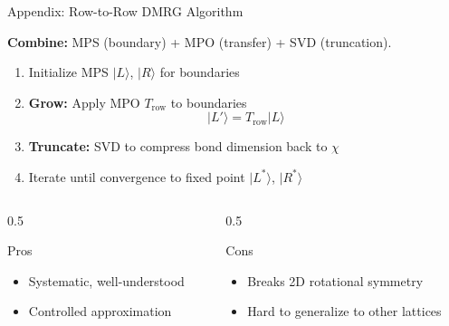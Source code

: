 \documentclass[aspectratio=169, 11pt]{beamer}
\begin{document}
\begin{frame}{Appendix: Row-to-Row DMRG Algorithm}
    
    \textbf{Combine:} MPS (boundary) + MPO (transfer) + SVD (truncation).
    
    \vspace{0.3cm}
    
    \begin{enumerate}
        \item Initialize MPS $|L\rangle$, $|R\rangle$ for boundaries
        
        \item \textbf{Grow:} Apply MPO $T_{\text{row}}$ to boundaries
        \[
        |L'\rangle = T_{\text{row}} |L\rangle
        \]
        
        \item \textbf{Truncate:} SVD to compress bond dimension back to $\chi$
        
        \item Iterate until convergence to fixed point $|L^*\rangle$, $|R^*\rangle$
    \end{enumerate}
    
    \vspace{0.3cm}
    
    \begin{columns}
        \begin{column}{0.5\textwidth}
            \begin{block}{Pros}
                \begin{itemize}
                    \item Systematic, well-understood
                    \item Controlled approximation
                \end{itemize}
            \end{block}
        \end{column}
        \begin{column}{0.5\textwidth}
            \begin{alertblock}{Cons}
                \begin{itemize}
                    \item Breaks 2D rotational symmetry
                    \item Hard to generalize to other lattices
                \end{itemize}
            \end{alertblock}
        \end{column}
    \end{columns}
\end{frame}
\end{document}
